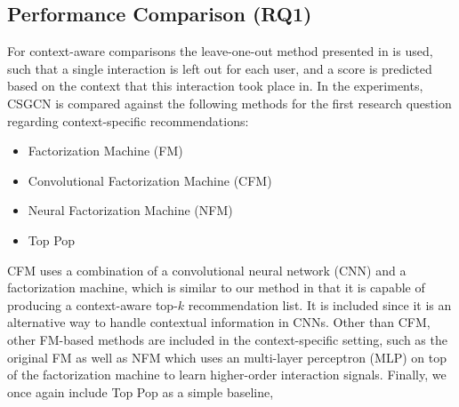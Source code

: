 \subsection{Performance Comparison (RQ1)}
For context-aware comparisons the leave-one-out method presented in  is used, such that a single interaction is left out for each user, and a score is predicted based on the context that this interaction took place in.
In the experiments, CSGCN is compared against the following methods for the first research question regarding context-specific recommendations:
\begin{itemize}
    \item Factorization Machine (FM)\cite{fmrendle}
    \item Convolutional Factorization Machine (CFM) \cite{CFM}
    \item Neural Factorization Machine (NFM) \cite{NeuralFM}
    \item Top Pop
\end{itemize}
CFM uses a combination of a convolutional neural network (CNN) and a factorization machine, which is similar to our method in that it is capable of producing a context-aware top-$k$ recommendation list.
It is included since it is an alternative way to handle contextual information in CNNs.
Other than CFM, other FM-based methods are included in the context-specific setting, such as the original FM as well as NFM which uses an multi-layer perceptron (MLP) on top of the factorization machine to learn higher-order interaction signals.
Finally, we once again include Top Pop as a simple baseline, 



